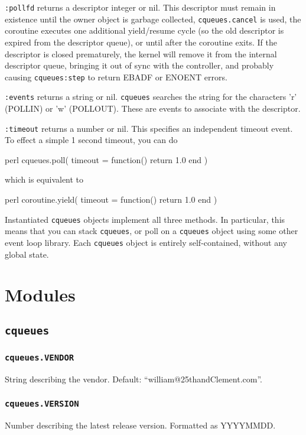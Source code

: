 \documentclass[11pt, oneside]{memoir}
\newcommand*{\cqueues}[0]{\texttt{cqueues}\xspace}
\newcommand*{\routine}[1]{\texttt{#1}\xspace}
\newcommand*{\method}[1]{\texttt{#1}\xspace}
\begin{document}
\method{:pollfd} returns a descriptor integer or nil. This descriptor must remain in existence until the owner object is garbage collected, \routine{cqueues.cancel} is used, the coroutine executes one additional yield/resume cycle (so the old descriptor is expired from the descriptor queue), or until after the coroutine exits. If the descriptor is closed prematurely, the kernel will remove it from the internal descriptor queue, bringing it out of sync with the controller, and probably causing \method{cqueues:step} to return EBADF or ENOENT errors.

\method{:events} returns a string or nil. \cqueues searches the string for the characters 'r' (POLLIN) or 'w' (POLLOUT). These are events to associate with the descriptor.

\method{:timeout} returns a number or nil. This specifies an independent timeout event. To effect a simple 1 second timeout, you can do

\begin{code}{perl}
        cqueues.poll({ timeout = function() return 1.0 end })
\end{code}

which is equivalent to

\begin{code}{perl}
        coroutine.yield({ timeout = function() return 1.0 end })
\end{code}

Instantiated \cqueues objects implement all three methods. In particular, this means that you can stack \cqueues, or poll on a \cqueues object using some other event loop library. Each \cqueues object is entirely self-contained, without any global state.

\section{Modules}

\subsection{\cqueues}

\subsubsection{\routine{cqueues.VENDOR}}
String describing the vendor. Default: ``william@25thandClement.com''.

\subsubsection{\routine{cqueues.VERSION}}
Number describing the latest release version. Formatted as YYYYMMDD.
\end{document}

